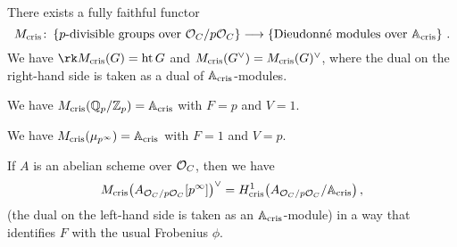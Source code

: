 \documentclass[a4paper, 10pt, oneside, DIV=9, chapterprefix=true, numbers=enddot,bibliography=totoc]{scrbook}
\begin{document}
\begin{prop}
	There exists a fully faithful functor
	\begin{equation*}
		M_\cris\colon \left\{p\text{-divisible groups over $\Oo_C/p\Oo_C$}\right\}\morphism\left\{\text{Dieudonné modules over }\IA_\cris\right\}\,.
	\end{equation*}
	We have $\rk M_\cris(G)=\hoehe G$ and $M_{\mathrm{cris}}(G^\vee)=M_{\mathrm{cris}}(G)^\vee$, where the dual on the right-hand side is taken as a dual of $\mathbb{A}_{\mathrm{cris}}$-modules.
\end{prop}
\begin{exm}\label{exm:Mcris}
	\begin{numerate}
		\item We have $M_{\mathrm{cris}}(\mathbb{Q}_p/\mathbb{Z}_p)=\mathbb{A}_{\mathrm{cris}}$ with $F=p$ and $V=1$.
		\item We have $M_{\mathrm{cris}}(\mu_{p^\infty})=\mathbb{A}_{\mathrm{cris}}$ with $F=1$ and $V=p$.
		\item If $A$ is an abelian scheme over $\mathcal{O}_C$, then we have 
		\begin{equation*}
			M_{\mathrm{cris}}\big(A_{\mathcal{O}_C/p\mathcal{O}_C}[p^\infty]\big)^\vee=H_{\mathrm{cris}}^1\big(A_{\mathcal{O}_C/p\mathcal{O}_C}/\mathbb{A}_{\mathrm{cris}}\big)\,,
		\end{equation*}
		(the dual on the left-hand side is taken as an $\mathbb{A}_{\mathrm{cris}}$-module) in a way that identifies $F$ with the usual Frobenius $\phi$.
	\end{numerate}
\end{exm}
\end{document}
